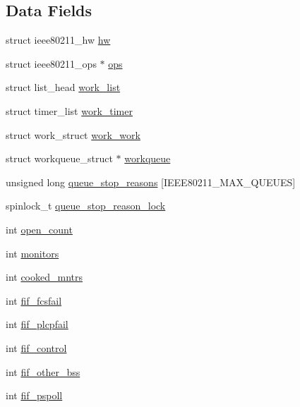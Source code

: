 \subsection*{Data Fields}
\begin{DoxyCompactItemize}
\item 
struct ieee80211\-\_\-hw \hyperlink{structieee80211__local_a076bd779234ea1780e71eee200bc0d2c}{hw}
\item 
struct ieee80211\-\_\-ops $\ast$ \hyperlink{structieee80211__local_a276a891dc24af93ff2578620eaa83190}{ops}
\item 
struct list\-\_\-head \hyperlink{structieee80211__local_a207d91b6483b2be61984ad3a064dbeb9}{work\-\_\-list}
\item 
struct timer\-\_\-list \hyperlink{structieee80211__local_a8a02d2a35aae73440084c24cb79a57af}{work\-\_\-timer}
\item 
struct work\-\_\-struct \hyperlink{structieee80211__local_a5c4560ff0f9e5c23485f07405ea29b34}{work\-\_\-work}
\item 
struct workqueue\-\_\-struct $\ast$ \hyperlink{structieee80211__local_a5ed2da065662e4534cb5bec3437a1876}{workqueue}
\item 
unsigned long \hyperlink{structieee80211__local_a4ac9818da187bbf4f141fd9e6ca1f0fd}{queue\-\_\-stop\-\_\-reasons} \mbox{[}I\-E\-E\-E80211\-\_\-\-M\-A\-X\-\_\-\-Q\-U\-E\-U\-E\-S\mbox{]}
\item 
spinlock\-\_\-t \hyperlink{structieee80211__local_a6a4677a1a1ad602030742ceba058133b}{queue\-\_\-stop\-\_\-reason\-\_\-lock}
\item 
int \hyperlink{structieee80211__local_a8943f3ee2b248b1fe911c0441c136c08}{open\-\_\-count}
\item 
int \hyperlink{structieee80211__local_a0bd1594e17d034f96ba795dabeaee577}{monitors}
\item 
int \hyperlink{structieee80211__local_a9ed7f1c7df7ff97118031d501ebf660c}{cooked\-\_\-mntrs}
\item 
int \hyperlink{structieee80211__local_a27eb74fe97bc47632e4e68f9987b7676}{fif\-\_\-fcsfail}
\item 
int \hyperlink{structieee80211__local_a11004cb6258d9a385000bc4544aa06b5}{fif\-\_\-plcpfail}
\item 
int \hyperlink{structieee80211__local_af26c59857ac99739a98a86955ccb73f4}{fif\-\_\-control}
\item 
int \hyperlink{structieee80211__local_a6df112d414c0a93f9b40417e0d08cdd1}{fif\-\_\-other\-\_\-bss}
\item 
int \hyperlink{structieee80211__local_a79f914bf1ffdca68ec910069d5f7aad4}{fif\-\_\-pspoll}

\end{DoxyCompactItemize}
